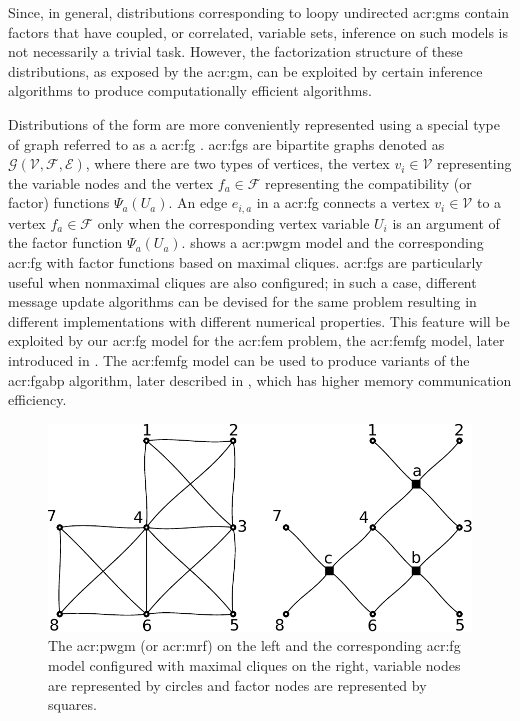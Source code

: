 Since, in general, distributions corresponding to loopy undirected \glspl{acr:gm} contain factors that have coupled, or correlated, variable sets, inference on such models is not necessarily a trivial task.
However, the factorization structure of these distributions, as exposed by the \gls{acr:gm}, can be exploited by certain inference algorithms to produce computationally efficient algorithms. 


Distributions of the form  are more conveniently represented using a special type of graph referred to as a \gls{acr:fg} \cite{bib:Kschischang2001FGATSA}.
\glspl{acr:fg} are bipartite graphs denoted as $\mathcal{G}(\mathcal{V},\mathcal{F},\mathcal{E})$, where there are two types of vertices, the vertex $v_i \in \mathcal{V}$ representing the variable nodes and the vertex $f_a \in \mathcal{F}$ representing the compatibility (or factor) functions $\Psi_a(U_a)$.
An edge $e_{i,a}$ in a \gls{acr:fg} connects a vertex $v_i \in \mathcal{V}$ to a vertex $f_a \in \mathcal{F}$ only when the corresponding vertex variable $U_i$ is an argument of the factor function $\Psi_a(U_a)$.
 shows a \gls{acr:pwgm} model and the corresponding \gls{acr:fg} with factor functions based on maximal cliques.
\glspl{acr:fg} are particularly useful when nonmaximal cliques are also configured; in such a case, different message update algorithms can be devised for the same problem resulting in different implementations with different numerical properties.
This feature will be exploited by our \gls{acr:fg} model for the \gls{acr:fem} problem, the \acrshort{acr:femfg} model, later introduced in .
The \gls{acr:femfg} model can be used to produce variants of the \gls{acr:fgabp} algorithm, later described in , which has higher memory communication efficiency.  


\begin{figure}
	\centering
	\includegraphics[scale=.9]{pw_vs_fg}
	\caption[The \acrshort{acr:pwgm} and the \acrshort{acr:fg} model.]{The \gls{acr:pwgm} (or \gls{acr:mrf}) on the left and the corresponding \gls{acr:fg} model configured with maximal cliques on the right, variable nodes are represented by circles and factor nodes are represented by squares.}
	\label{fig:pw_vs_fg}
\end{figure}


